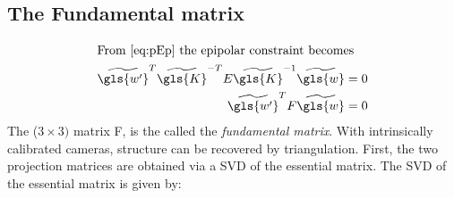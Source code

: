 \subsection{The Fundamental matrix}

\begin{align}
    \intertext{From \eqref{eq:pEp} the epipolar constraint becomes}
    \widetilde{\gls{w'}} ^T \widetilde{\gls{K}}^{-T} E \widetilde{\gls{K}}^{-1} \widetilde{\gls{w}}  &= 0 \\
    \widetilde{\gls{w'}} ^T F \widetilde{\gls{w}}  &= 0
\end{align}
The (\(3\times3)\) matrix \gls{F}, is the called the \emph{\gls{fundamental matrix}}.
With intrinsically calibrated cameras, structure can be recovered by triangulation.
First, the two projection matrices are obtained via a \gls{SVD} of the essential matrix.
The \gls{SVD} of the \gls{essential matrix} is given by:

